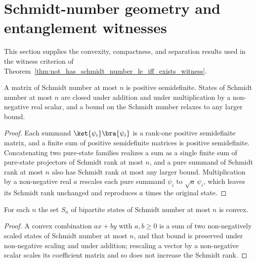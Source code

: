\section{Schmidt-number geometry and entanglement witnesses}
\label{sec:app_positive_not_cp_schmidt_number_geometry}

This section supplies the convexity, compactness, and separation results used
in the witness criterion of Theorem~\ref{thm:not_has_schmidt_number_le_iff_exists_witness}.

\begin{theorem}
    \label{thm:has_schmidt_number_le_basic}
    \leanok
    A matrix of Schmidt number at most $n$ is positive semidefinite. States of
    Schmidt number at most $n$ are closed under addition and under multiplication by a
    non-negative real scalar, and a bound on the Schmidt number relaxes to any larger
    bound.
\end{theorem}

\begin{proof}
    \leanok
    Each summand $\ket{\psi_i}\bra{\psi_i}$ is a rank-one positive semidefinite
    matrix, and a finite sum of positive semidefinite matrices is positive
    semidefinite. Concatenating two pure-state families realizes a sum as a single
    finite sum of pure-state projectors of Schmidt rank at most $n$, and a pure
    summand of Schmidt rank at most $n$ also has Schmidt rank at most any larger
    bound. Multiplication by a non-negative real $a$ rescales each pure summand
    $\psi_i$ to $\sqrt a\,\psi_i$, which leaves its Schmidt rank unchanged and
    reproduces $a$ times the original state.
\end{proof}

\begin{theorem}
    \label{thm:convex_setOf_has_schmidt_number_le}
    \leanok
    For each $n$ the set $S_n$ of bipartite states of Schmidt number at most $n$ is
    convex.
\end{theorem}

\begin{proof}
    \leanok
    A convex combination $a x + b y$ with $a,b\ge 0$ is a sum of two non-negatively
    scaled states of Schmidt number at most $n$, and that bound is preserved under
    non-negative scaling and under addition; rescaling a vector by a non-negative
    scalar scales its coefficient matrix and so does not increase the Schmidt rank.
\end{proof}

